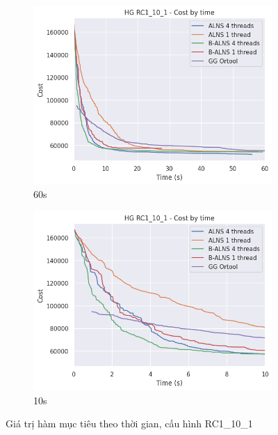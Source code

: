 \begin{figure}[H] %
  \label{fig:perf_ct_rc1_10}
  \begin{subfigure}{.5\textwidth}
    \centering
    \includegraphics[width=1\linewidth]{figures/cost_time_60s_RC1_10_1.png}
    \caption{60s}
    \label{fig:perf_ct_rc1_10_60s}
  \end{subfigure}%
  \begin{subfigure}{.5\textwidth}
    \centering
    \includegraphics[width=1\linewidth]{figures/cost_time_10s_RC1_10_1.png}
    \caption{10s}
    \label{fig:perf_ct_rc1_10_10s}
  \end{subfigure}
  \caption{Giá trị hàm mục tiêu theo thời gian, cấu hình RC1\_10\_1}
\end{figure}

